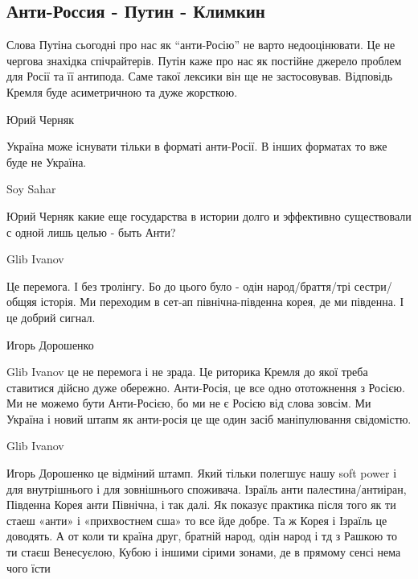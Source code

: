  
 
 
 
 

\subsection{Анти-Россия - Путин - Климкин}

Слова Путіна сьогодні про нас як \enquote{анти-Росію} не варто недооцінювати.
Це не чергова знахідка спічрайтерів. Путін каже про нас як постійне джерело
проблем для Росії та її антипода. Саме такої лексики він ще не застосовував.
Відповідь Кремля буде асиметричною та дуже жорсткою.

Юрий Черняк

Україна може існувати тільки в форматі анти-Росії. В інших форматах то вже буде не Україна.

Soy Sahar

Юрий Черняк какие еще государства в истории долго и эффективно существовали с одной лишь целью - быть Анти?

Glib Ivanov

Це перемога. І без тролінгу. Бо до цього було - одін народ/браття/трі
сестри/общяя історія. Ми переходим в сет-ап північна-південна корея, де ми
південна. І це добрий сигнал.

Игорь Дорошенко

Glib Ivanov це не перемога і не зрада. Це риторика Кремля до якої треба
ставитися дійсно дуже обережно. Анти-Росія, це все одно ототожнення з Росією.
Ми не можемо бути Анти-Росією, бо ми не є Росією від слова зовсім. Ми Україна і
новий штапм як анти-росія це ще один засіб маніпулювання свідомістю.

Glib Ivanov

Игорь Дорошенко це відміний штамп. Який тільки полегшує нашу soft power і для внутрішнього і для зовнішнього споживача. Ізраїль анти палестина/антиіран, Південна Корея анти Північна, і так далі. Як показує практика після того як ти стаеш «анти» і «прихвостнем сша» то все йде добре. Та ж Корея і Ізраїль це доводять. А от коли ти країна друг, братній народ, одін народ і тд з Рашкою то ти стаєш Венесуєлою, Кубою і іншими сірими зонами, де в прямому сенсі нема чого їсти


